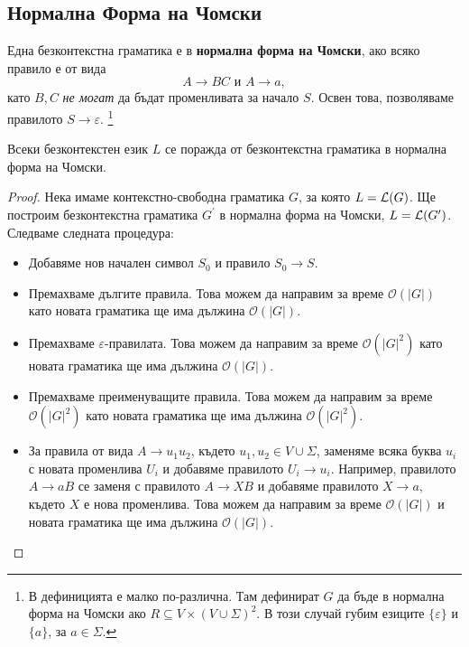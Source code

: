 \subsection{Нормална Форма на Чомски}
Една безконтекстна граматика е в {\bf нормална форма на Чомски}, ако
всяко правило е от вида
\[A \rightarrow BC\mbox{ и }A \rightarrow a,\]
като $B, C$ {\em не могат} да бъдат променливата за начало $S$.
Освен това, позволяваме правилото $S\to\varepsilon$.
\footnote{В \cite[стр. 151]{papadimitriou} дефиницията е малко по-различна.
Там дефинират $G$ да бъде в нормална форма на Чомски ако $R \subseteq V\times(V\cup\Sigma)^2$.
В този случай губим езиците $\{\varepsilon\}$ и $\{a\}$, за $a\in\Sigma$.}

\begin{framed}
  \begin{thm}
    Всеки безконтекстен език $L$ се поражда от безконтекстна граматика в нормална форма на Чомски.
  \end{thm}
\end{framed}
\begin{proof}
  Нека имаме контекстно-свободна граматика $G$, за която $L = \mathcal{L}(G)$.
  Ще построим безконтекстна граматика $G^\prime$ в нормална форма на Чомски, $L = \mathcal{L}(G^\prime)$.
  Следваме следната процедура:
  \begin{itemize}
  \item
    Добавяме нов начален символ $S_0$ и правило $S_0 \to S$.
  \item
    Премахваме дългите правила.
    Това можем да направим за време $\mathcal{O}(|G|)$
    като новата граматика ще има дължина $\mathcal{O}(|G|)$.
  \item
    Премахваме $\varepsilon$-правилата.
    Това можем да направим за време $\mathcal{O}(|G|^2)$
    като новата граматика ще има дължина $\mathcal{O}(|G|)$.
  \item
    Премахваме преименуващите правила.
    Това можем да направим за време $\mathcal{O}(|G|^2)$
    като новата граматика ще има дължина $\mathcal{O}(|G|^2)$.
  \item
    За правила от вида $A\to u_1 u_2$, където $u_1, u_2 \in V \cup \Sigma$, 
    заменяме всяка буква $u_i$ с новата променлива $U_i$
    и добавяме правилото $U_i\to u_i$.
    Например, правилото $A \to aB$ се заменя с правилото $A \to XB$ и добавяме правилото $X \to a$,
    където $X$ е нова променлива.
    Това можем да направим за време $\mathcal{O}(|G|)$ и новата граматика ще има дължина $\mathcal{O}(|G|)$.
  \end{itemize}
\end{proof}


